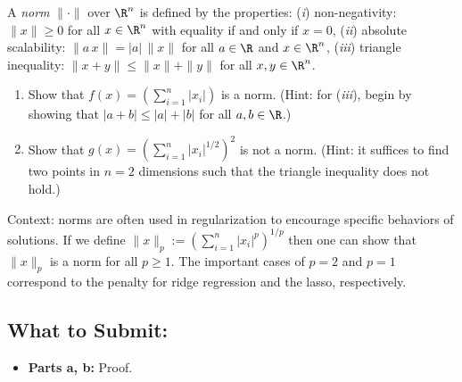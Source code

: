 \documentclass{article}
\begin{document}
\begin{aprob}
    A \emph{norm} $\|\cdot\|$ over $\R^n$ is defined by the properties:
    (\textit{i}) non-negativity: $\|x\|\geq 0$ for all $x \in \R^n$ with equality if and only if $x=0$,
    (\textit{ii}) absolute scalability: $\|a \, x\| = |a| \, \|x\|$ for all $a \in \R$ and $x \in \R^n$, 
    (\textit{iii}) triangle inequality: $\|x+y\| \leq \|x\| + \|y\|$ for all $x,y \in \R^n$.
    \begin{enumerate}
      \item {} Show that $f(x) = \left( \sum_{i=1}^n |x_i| \right)$ is a norm. (Hint: for (\textit{iii}), begin by showing that $|a+b|\leq |a| + |b|$ for all $a,b \in \R$.)
      \item {} Show that $g(x) = \left(\sum_{i=1}^n |x_i|^{1/2}\right)^2$ is not a norm. (Hint: it suffices to find two points in $n=2$ dimensions such that the triangle inequality does not hold.)
    \end{enumerate} 
    Context: norms are often used in regularization to encourage specific behaviors of solutions. If we define  $\| x \|_p := \left( \sum_{i=1}^n |x_i|^{p} \right)^{1/p}$ then one can show that $\| x \|_p$ is a norm for all $p \geq 1$. The important cases of $p=2$ and $p=1$ correspond to the penalty for ridge regression and the lasso, respectively. \\
    
    \subsection*{What to Submit:}
    \begin{itemize}
        \item \textbf{Parts a, b:} Proof.
    \end{itemize}
\end{aprob}
\end{document}
